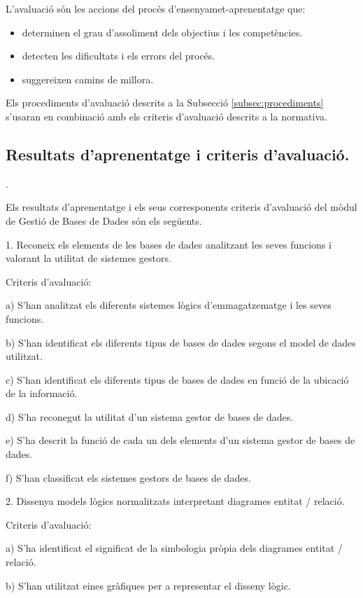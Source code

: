 \documentclass[catalan, a4paper, 12pt, titlepage]{article}
\begin{document}
L'avaluació \cite{coll2017} són les accions del procés d'ensenyamet-aprenentatge que:

\begin{itemize}
	\item determinen el grau d'assoliment dels objectius i les competències.
	\item detecten les dificultats i els errors del procés.
	\item suggereixen camins de millora.
\end{itemize}

Els procediments d'avaluació descrits a la Subsecció \ref{subsec:procediments} s'usaran en combinació amb els criteris d'avaluació descrits a la normativa.

\subsection{Resultats d'aprenentatge i criteris d'avaluació.}
\label{subsec:resultats}.

Els resultats d'aprenentatge i els seus corresponents criteris d'avaluació del mòdul de Gestió de Bases de Dades són els següents.

1. Reconeix els elements de les bases de dades analitzant les seves funcions i valorant la utilitat de sistemes gestors.

Criteris d'avaluació:

a) S'han analitzat els diferents sistemes lògics d'emmagatzematge i les seves funcions.

b) S'han identificat els diferents tipus de bases de dades segons el model de dades utilitzat.

c) S'han identificat els diferents tipus de bases de dades en funció de la ubicació de la informació.

d) S'ha reconegut la utilitat d'un sistema gestor de bases de dades.

e) S'ha descrit la funció de cada un dels elements d'un sistema gestor de bases de dades.

f) S'han classificat els sistemes gestors de bases de dades.

2. Dissenya models lògics normalitzats interpretant diagrames entitat / relació.

Criteris d'avaluació:

a) S'ha identificat el significat de la simbologia pròpia dels diagrames entitat / relació.

b) S'han utilitzat eines gràfiques per a representar el disseny lògic.
\end{document}
